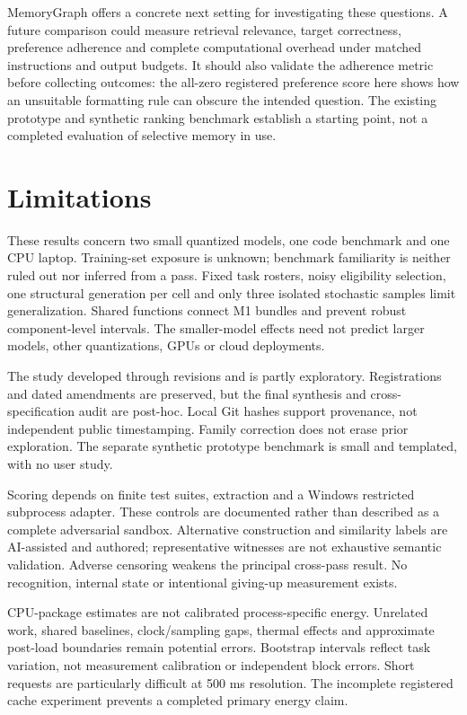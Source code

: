 \documentclass[10pt,a4paper,twocolumn]{article}
\begin{document}
MemoryGraph offers a concrete next setting for investigating these questions.
A future comparison could measure retrieval relevance, target correctness,
preference adherence and complete computational overhead under matched
instructions and output budgets. It should also validate the adherence metric
before collecting outcomes: the all-zero registered preference score here shows
how an unsuitable formatting rule can obscure the intended question. The
existing prototype and synthetic ranking benchmark establish a starting point,
not a completed evaluation of selective memory in use.

\section{Limitations}
These results concern two small quantized models, one code benchmark and one CPU
laptop. Training-set exposure is unknown; benchmark familiarity is neither ruled
out nor inferred from a pass. Fixed task rosters, noisy eligibility selection,
one structural generation per cell and only three isolated stochastic samples
limit generalization. Shared functions connect M1 bundles and prevent robust
component-level intervals. The smaller-model effects need not predict larger
models, other quantizations, GPUs or cloud deployments.

The study developed through revisions and is partly exploratory. Registrations and dated amendments
are preserved, but the final synthesis and cross-specification audit are
post-hoc. Local Git hashes support provenance, not independent public
timestamping. Family correction does not erase prior exploration. The separate
synthetic prototype benchmark is small and templated, with no user study.

Scoring depends on finite test suites, extraction and a Windows restricted
subprocess adapter. These controls are documented rather than described as a
complete adversarial sandbox. Alternative construction and similarity labels
are AI-assisted and authored; representative witnesses are not exhaustive
semantic validation. Adverse censoring weakens the principal cross-pass result.
No recognition, internal state or intentional giving-up measurement exists.

CPU-package estimates are not calibrated process-specific energy. Unrelated
work, shared baselines, clock/sampling gaps, thermal effects and approximate
post-load boundaries remain potential errors. Bootstrap intervals reflect task
variation, not measurement calibration or independent block errors. Short
requests are particularly difficult at 500 ms resolution. The incomplete
registered cache experiment prevents a completed primary energy claim.
\end{document}
